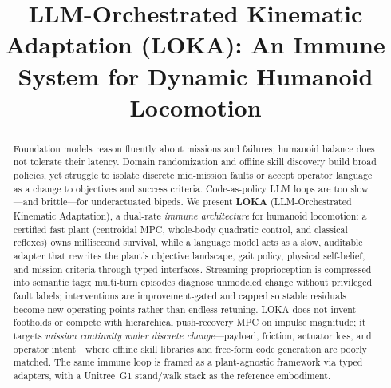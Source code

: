 \documentclass[conference]{IEEEtran}
\begin{document}
\title{LLM-Orchestrated Kinematic Adaptation (LOKA): An Immune System for Dynamic Humanoid Locomotion}

\author{
\and
{}
\and
{}
}

\maketitle

\begin{abstract}
Foundation models reason fluently about missions and failures; humanoid balance does not tolerate their latency.
Domain randomization and offline skill discovery build broad policies, yet struggle to isolate discrete mid-mission faults or accept operator language as a change to objectives and success criteria.
Code-as-policy LLM loops are too slow---and brittle---for underactuated bipeds.
We present \textbf{LOKA} (LLM-Orchestrated Kinematic Adaptation), a dual-rate \emph{immune architecture} for humanoid locomotion: a certified fast plant (centroidal MPC, whole-body quadratic control, and classical reflexes) owns millisecond survival, while a language model acts as a slow, auditable adapter that rewrites the plant's objective landscape, gait policy, physical self-belief, and mission criteria through typed interfaces.
Streaming proprioception is compressed into semantic tags; multi-turn episodes diagnose unmodeled change without privileged fault labels; interventions are improvement-gated and capped so stable residuals become new operating points rather than endless retuning.
LOKA does not invent footholds or compete with hierarchical push-recovery MPC on impulse magnitude; it targets \emph{mission continuity under discrete change}---payload, friction, actuator loss, and operator intent---where offline skill libraries and free-form code generation are poorly matched.
The same immune loop is framed as a plant-agnostic framework via typed adapters, with a Unitree~G1 stand/walk stack as the reference embodiment.
\end{abstract}
\end{document}
